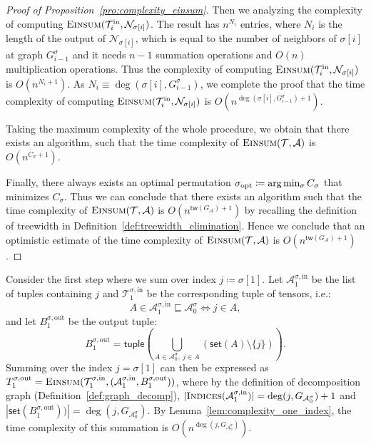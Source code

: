 \documentclass[12pt]{article}
\theoremstyle{plain}
\theoremstyle{definition}
\newcommand{\takesetp}[1]{\mathsf{set}(#1)}
\newcommand{\taketuplep}[1]{\mathsf{tuple}\left( #1 \right)}
\newcommand{\indexset}{\textsc{Indices}}
\newcommand{\tensorcontraction}{\textsc{Einsum}}
\newcommand{\degp}[2]{\deg(#1,#2)}
\newcommand{\treewidthp}[1]{\mathsf{tw}(#1)}
\newcommand{\graphform}[1]{G_{#1}}
\newcommand{\less}{O}
\def\calA{\mathcal{A}}
\def\calT{\mathcal{T}}
\def\calN{\mathcal{N}}
\begin{document}
\begin{bibunit}[agsm]
\begin{proof}[Proof of Proposition~\ref{pro:complexity_einsum}]
Then we analyzing the complexity of computing $\tensorcontraction(\calT_i^{\mathrm{in}},\calN_{\sigma[i]})$. The result has $n^{N_i}$ entries, where $N_i$ is the length of the output of $\calN_{\sigma[i]}$, which is equal to the number of neighbors of $\sigma[i]$ at graph $G^\sigma_{i-1}$ and it needs $n-1$ summation operations and $\less(n)$ multiplication operations. Thus the complexity of computing $\tensorcontraction(\calT_i^{\mathrm{in}},\calN_{\sigma[i]})$ is $O(n^{N_i+1})$. As $N_i \equiv \degp{\sigma[i]}{G^\sigma_{i-1}}$, we complete the proof that the time complexity of computing $\tensorcontraction(\calT_i^{\mathrm{in}},\calN_{\sigma[i]})$ is $\less(n^{\degp{\sigma[i]}{G^\sigma_{i-1}}+1})$.

Taking the maximum complexity of the whole procedure, we obtain that there exists an algorithm, such that the time complexity of $\tensorcontraction(\calT, \calA)$ is $\less(n^{C_\sigma + 1})$.

Finally, there always exists an optimal permutation $\sigma_{\rm opt} \coloneqq \arg \min_{\sigma} C_{\sigma}$ that minimizes $C_\sigma$. Thus we can conclude that there exists an algorithm such that the time complexity of $\tensorcontraction(\calT, \calA)$ is $\less(n^{\treewidthp{G_\calA}+1})$ by recalling the definition of treewidth in Definition~\ref{def:treewidth_elimination}. Hence we conclude that an optimistic estimate of the time complexity of $\tensorcontraction(\calT, \calA)$ is $\less(n^{\treewidthp{G_\calA}+1})$.
\end{proof}
\fi
\iffalse
Consider the first step where we sum over index $j \coloneqq \sigma[1]$. Let $\calA^{\sigma, \mathrm{in}}_{1}$ be the list of tuples containing $j$ and $\calT^{\sigma, \mathrm{in}}_{1}$ be the corresponding tuple of tensors, i.e.:
    \begin{equation*}
    A \in \calA^{\sigma, \mathrm{in}}_{1} \sqsubseteq \calA^{\sigma}_0 \iff j \in A,
    \end{equation*}
    and let $B^{\sigma, \mathrm{out}}_{1}$ be the output tuple: 
    \begin{equation*}
    B^{\sigma, \mathrm{out}}_{1} = \taketuplep{\bigcup_{A \in \calA^{\sigma}_{0},\ j \in A} (\takesetp{A} \setminus \{j\}) }. 
    \end{equation*}
    Summing over the index $j = \sigma[1]$ can then be expressed as $T^{\sigma,\mathrm{out}}_{1} = \tensorcontraction(\calT^{\sigma, \mathrm{in}}_{1}, (\calA^{\sigma, \mathrm{in}}_{1}, B^{\sigma, \mathrm{out}}_{1}))$, where by the definition of decomposition graph (Definition~\ref{def:graph_decomp}), $|\indexset(\calA^{\sigma, \mathrm{in}}_{1})| = \degp{j}{\graphform{\calA^{\sigma}_0}} + 1$ and $|\takesetp{B^{\sigma, \mathrm{out}}_{1})}| = \degp{j}{\graphform{\calA^{\sigma}_0}}$. By Lemma~\ref{lem:complexity_one_index}, the time complexity of this summation is $\less(n^{\degp{j}{\graphform{\calA^{\sigma}_0}}} )$. 
    

\end{bibunit}
\end{document}
